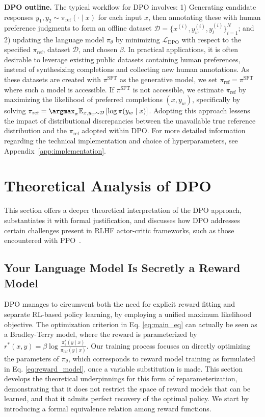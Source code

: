 \textbf{DPO outline.} The typical workflow for DPO involves: 1) Generating candidate responses $y_1, y_2 \sim \pi_\text{ref}(\cdot \mid x)$ for each input $x$, then annotating these with human preference judgments to form an offline dataset $\mathcal{D} = \{x^{(i)}, y_w^{(i)}, y_l^{(i)}\}_{i=1}^N$; and 2) updating the language model $\pi_\theta$ by minimizing $\mathcal{L}_\text{DPO}$ with respect to the specified $\pi_\text{ref}$, dataset $\mathcal{D}$, and chosen $\beta$. In practical applications, it is often desirable to leverage existing public datasets containing human preferences, instead of synthesizing completions and collecting new human annotations. As these datasets are created with $\pi^\text{SFT}$ as the generative model, we set $\pi_\text{ref} = \pi^\text{SFT}$ where such a model is accessible. If $\pi^\text{SFT}$ is not accessible, we estimate $\pi_\text{ref}$ by maximizing the likelihood of preferred completions ${(x, y_w)}$, specifically by solving ${\pi_\text{ref} = \argmax_{\pi}\mathbb{E}_{x, y_w \sim \mathcal{D}}\left[\log \pi(y_w \mid x)\right]}$. Adopting this approach lessens the impact of distributional discrepancies between the unavailable true reference distribution and the $\pi_\text{ref}$ adopted within DPO. For more detailed information regarding the technical implementation and choice of hyperparameters, see Appendix~\ref{app:implementation}.

\section{Theoretical Analysis of DPO} This section offers a deeper theoretical interpretation of the DPO approach, substantiates it with formal justification, and discusses how DPO addresses certain challenges present in RLHF actor-critic frameworks, such as those encountered with PPO~\cite{schulman2017proximal}.

\label{sec:theory}

\subsection{Your Language Model Is Secretly a Reward Model} DPO manages to circumvent both the need for explicit reward fitting and separate RL-based policy learning, by employing a unified maximum likelihood objective. The optimization criterion in Eq. \ref{eq:main_eq} can actually be seen as a Bradley-Terry model, where the reward is parameterized by $r^*(x, y) = \beta \log\frac{\pi^*_\theta(y \mid x)}{\pi_\text{ref}(y \mid x)}$. Our training process focuses on directly optimizing the parameters of $\pi_{\theta}$, which corresponds to reward model training as formulated in Eq. \ref{eq:reward_model}, once a variable substitution is made. This section develops the theoretical underpinnings for this form of reparameterization, demonstrating that it does not restrict the space of reward models that can be learned, and that it admits perfect recovery of the optimal policy. We start by introducing a formal equivalence relation among reward functions.

